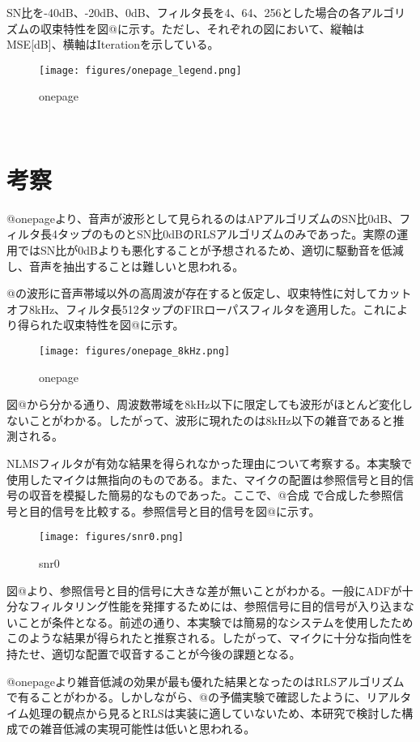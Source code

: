 SN比を-40dB、-20dB、0dB、フィルタ長を4、64、256とした場合の各アルゴリズムの収束特性を図@に示す。ただし、それぞれの図において、縦軸はMSE{[}dB{]}、横軸はIterationを示している。

\begin{figure}
\centering
\texttt{[image: figures/onepage\_legend.png]}
\caption{onepage}
\end{figure}

\
\section{考察}\label{ux8003ux5bdf}

@onepageより、音声が波形として見られるのはAPアルゴリズムのSN比0dB、フィルタ長4タップのものとSN比0dBのRLSアルゴリズムのみであった。実際の運用ではSN比が0dBよりも悪化することが予想されるため、適切に駆動音を低減し、音声を抽出することは難しいと思われる。

@の波形に音声帯域以外の高周波が存在すると仮定し、収束特性に対してカットオフ8kHz、フィルタ長512タップのFIRローパスフィルタを適用した。これにより得られた収束特性を図@に示す。

\begin{figure}
\centering
\texttt{[image: figures/onepage\_8kHz.png]}
\caption{onepage}
\end{figure}

図@から分かる通り、周波数帯域を8kHz以下に限定しても波形がほとんど変化しないことがわかる。したがって、波形に現れたのは8kHz以下の雑音であると推測される。

NLMSフィルタが有効な結果を得られなかった理由について考察する。本実験で使用したマイクは無指向のものである。また、マイクの配置は参照信号と目的信号の収音を模擬した簡易的なものであった。ここで、@合成
で合成した参照信号と目的信号を比較する。参照信号と目的信号を図@に示す。

\begin{figure}
\centering
\texttt{[image: figures/snr0.png]}
\caption{snr0}
\end{figure}

図@より、参照信号と目的信号に大きな差が無いことがわかる。一般にADFが十分なフィルタリング性能を発揮するためには、参照信号に目的信号が入り込まないことが条件となる。前述の通り、本実験では簡易的なシステムを使用したためこのような結果が得られたと推察される。したがって、マイクに十分な指向性を持たせ、適切な配置で収音することが今後の課題となる。

@onepageより雑音低減の効果が最も優れた結果となったのはRLSアルゴリズムで有ることがわかる。しかしながら、@の予備実験で確認したように、リアルタイム処理の観点から見るとRLSは実装に適していないため、本研究で検討した構成での雑音低減の実現可能性は低いと思われる。
